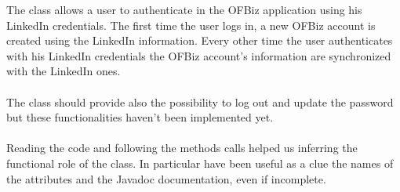 The class allows a user to authenticate in the OFBiz application using his LinkedIn credentials. The first time the user logs in, a new OFBiz account is created using the LinkedIn information. Every other time the user authenticates with his LinkedIn credentials the OFBiz account's information are synchronized with the LinkedIn ones. \\
\\
The class should provide also the possibility to log out and update the password but these functionalities haven't been implemented yet. \\
\\
Reading the code and following the methods calls helped us inferring the functional role of the class. In particular have been useful as a clue the names of the attributes and the Javadoc documentation, even if incomplete. \\
